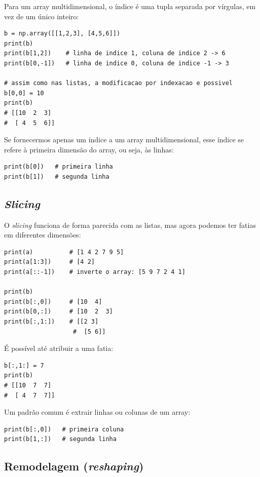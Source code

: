 \documentclass[11pt,a4paper]{article}
\begin{document}
Para um array multidimensional, o índice é uma tupla separada por
vírgulas, em vez de um único inteiro:

\begin{lstlisting}
b = np.array([[1,2,3], [4,5,6]])
print(b)
print(b[1,2])    # linha de indice 1, coluna de indice 2 -> 6
print(b[0,-1])   # linha de indice 0, coluna de indice -1 -> 3

# assim como nas listas, a modificacao por indexacao e possivel
b[0,0] = 10
print(b)
# [[10  2  3]
#  [ 4  5  6]]
\end{lstlisting}

Se fornecermos apenas um índice a um array multidimensional, esse
índice se refere à primeira dimensão do array, ou seja, às linhas:

\begin{lstlisting}
print(b[0])   # primeira linha
print(b[1])   # segunda linha
\end{lstlisting}

\subsection{\emph{Slicing}}

O \emph{slicing} funciona de forma parecida com as listas, mas agora
podemos ter fatias em diferentes dimensões:

\begin{lstlisting}
print(a)          # [1 4 2 7 9 5]
print(a[1:3])     # [4 2]
print(a[::-1])    # inverte o array: [5 9 7 2 4 1]

print(b)
print(b[:,0])     # [10  4]
print(b[0,:])     # [10  2  3]
print(b[:,1:])    # [[2 3]
                   #  [5 6]]
\end{lstlisting}

É possível até atribuir a uma fatia:

\begin{lstlisting}
b[:,1:] = 7
print(b)
# [[10  7  7]
#  [ 4  7  7]]
\end{lstlisting}

Um padrão comum é extrair linhas ou colunas de um array:

\begin{lstlisting}
print(b[:,0])   # primeira coluna
print(b[1,:])   # segunda linha
\end{lstlisting}

\subsection{Remodelagem (\emph{reshaping})}
\end{document}
